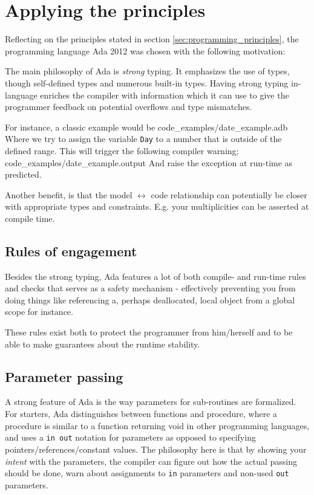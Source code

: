 \documentclass[10pt,a4paper]{article}
\def\Code#1{\texttt{#1}}
\begin{document}
\section{Applying the principles}
Reflecting on the principles stated in section \ref{sec:programming_principles}, the programming language Ada 2012 was chosen with the following motivation:

The main philosophy of Ada is \emph{strong} typing. It emphasizes the use of types, though self-defined types and numerous built-in types. Having strong typing in-language enriches the compiler with information which it can use to give the programmer feedback on potential overflows and type mismatches.

For instance, a classic example would be
 {code_examples/date_example.adb}
Where we try to assign the variable \Code{Day} to a number that is outside of the defined range. This will trigger the following compiler warning;
 {code_examples/date_example.output}
And raise the exception at run-time as predicted.

Another benefit, is that the model $\leftrightarrow$ code relationship can potentially be closer with appropriate types and constraints. E.g. your multiplicities can be asserted at compile time.

\subsection{Rules of engagement}
Besides the strong typing, Ada features a lot of both compile- and run-time rules and checks that serves as a safety mechanism - effectively preventing you from doing things like referencing a, perhaps deallocated, local object from a global scope for instance.

These rules exist both to protect the programmer from him/herself and to be able to make guarantees about the runtime stability.

\subsection{Parameter passing}
A strong feature of Ada is the way parameters for sub-routines are formalized. For starters, Ada distinguishes between functions and procedure, where a procedure is similar to a function returning void in other programming languages, and uses a \Code{in out} notation for parameters as opposed to specifying pointers/references/constant values. The philosophy here is that by showing your \emph{intent} with the parameters, the compiler can figure out how the actual passing should be done, warn about assignments to \Code{in} parameters and non-used \Code{out} parameters.
\end{document}
